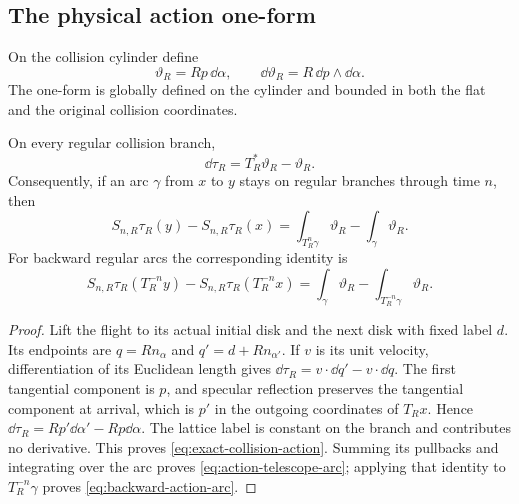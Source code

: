 \subsection{The physical action one-form}
On the collision cylinder define
\begin{equation}\label{eq:collision-action-form}
 \vartheta_R=Rp\,\dd\alpha,\qquad
 \dd\vartheta_R=R\,\dd p\wedge\dd\alpha.
\end{equation}
The one-form is globally defined on the cylinder and bounded in both
the flat and the original collision coordinates.

\begin{lemma}
\label{lem:exact-collision-action}
On every regular collision branch,
\begin{equation}\label{eq:exact-collision-action}
 \dd\tau_R=T_R^*\vartheta_R-\vartheta_R.
\end{equation}
Consequently, if an arc $\gamma$ from $x$ to $y$ stays on regular
branches through time $n$, then
\begin{equation}\label{eq:action-telescope-arc}
 S_{n,R}\tau_R(y)-S_{n,R}\tau_R(x)
       =\int_{T_R^n\gamma}\vartheta_R-\int_\gamma\vartheta_R.
\end{equation}
For backward regular arcs the corresponding identity is
\begin{equation}\label{eq:backward-action-arc}
 S_{n,R}\tau_R(T_R^{-n}y)-S_{n,R}\tau_R(T_R^{-n}x)
       =\int_\gamma\vartheta_R-\int_{T_R^{-n}\gamma}\vartheta_R.
\end{equation}
\end{lemma}
\begin{proof}
Lift the flight to its actual initial disk and the next disk with fixed
label $d$. Its endpoints are $q=Rn_\alpha$ and
$q'=d+Rn_{\alpha'}$. If $v$ is its unit velocity, differentiation of
its Euclidean length gives
$\dd\tau_R=v\cdot\dd q'-v\cdot\dd q$.
The first tangential component is $p$, and specular reflection preserves
the tangential component at arrival, which is $p'$ in the outgoing
coordinates of $T_Rx$. Hence
$\dd\tau_R=Rp'\dd\alpha'-Rp\dd\alpha$. The lattice label is constant
on the branch and contributes no derivative. This proves
\eqref{eq:exact-collision-action}. Summing its pullbacks and integrating
over the arc proves \eqref{eq:action-telescope-arc}; applying that
identity to $T_R^{-n}\gamma$ proves \eqref{eq:backward-action-arc}.
\end{proof}

